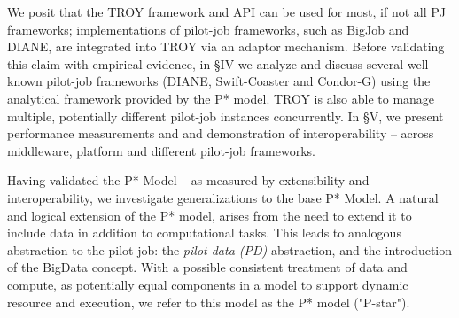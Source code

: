 \documentclass[conference,final]{IEEEtran}
\newcommand{\jhanote}[1]{ {\textcolor{red} { ***shantenu: #1 }}}
\newcommand{\alnote}[1]{ {\textcolor{blue} { ***andre: #1 }}}
\newcommand{\alnote}[1]{}
\newcommand{\jhanote}[1]{}
\begin{document}
We posit that the TROY framework and API can be used for most, if not
all PJ frameworks; implementations of pilot-job frameworks, such as
BigJob and DIANE, are integrated into TROY via an adaptor mechanism.
Before validating this claim with empirical evidence, in \S{IV} we
analyze and discuss several well-known pilot-job frameworks (DIANE,
Swift-Coaster and Condor-G) using the analytical framework provided by
the P* model.  TROY is also able to manage multiple, potentially
different pilot-job instances concurrently. In \S{V}, we present
performance measurements and and demonstration of interoperability --
across middleware, platform and different pilot-job frameworks.

Having validated the P* Model -- as measured by extensibility and
interoperability, we investigate generalizations to the base P* Model.
A natural and logical extension of the P* model, arises from the need
to extend it to include data in addition to computational tasks.  This
leads to analogous abstraction to the pilot-job: the \emph{pilot-data
  (PD)} abstraction, and the introduction of the BigData concept. With
a possible consistent treatment of data and compute, as potentially
equal components in a model to support dynamic resource and execution,
we refer to this model as the P* model ("P-star").








\end{document}
